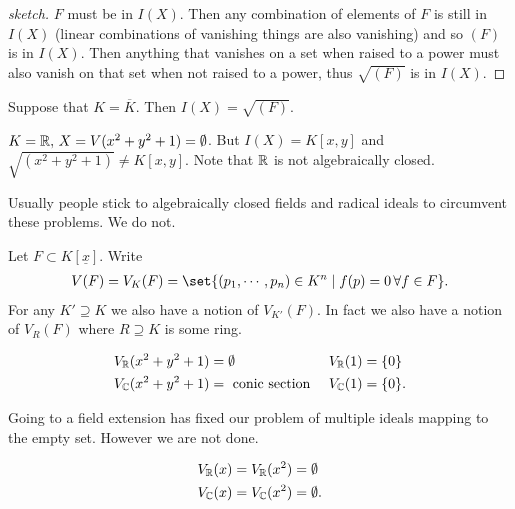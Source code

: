 \begin{proof}[sketch]
$F$ must be in $I(X)$. Then any combination of elements of $F$ is still in $I(X)$ (linear combinations of vanishing things are also vanishing) and so $(F)$ is in $I(X)$. Then anything that vanishes on a set when raised to a power must also vanish on that set when not raised to a power, thus $\sqrt{ (F) }$ is in $I(X)$.
\end{proof}

\begin{theorem}[Nullstellensatz]
Suppose that $K = \overline{K}$. Then $I(X) = \sqrt{ (F) }$.
\end{theorem}

\begin{nexample}
    $K = \mathbb{R}, \, X = V(x^2 + y^2 +1) = \emptyset$. But $I(X) = K[x,y]$ and $\sqrt{(x^2 + y^2 +1)} \neq K[x,y]$. Note that $\mathbb{R}$ is not algebraically closed.
\end{nexample}

Usually people stick to algebraically closed fields and radical ideals to circumvent these problems. We do not.

Let $F \subset K[ \underline{x} ] $. Write
\begin{align*}
    V(F) = V_K (F) = \set{(p_1, \cdots , p_n ) \in K^n \mid f(p) = 0 \, \forall f \in F}.
\end{align*}
For any $K' \supseteq K$ we also have a notion of $V_{K'}(F)$. In fact we also have a notion of $V_R ( F)$ where $R \supseteq K$ is some ring.

\begin{example}
    \begin{align*}
        V_{\mathbb{R}} ( x^2 + y^2 + 1) &= \emptyset & V_{\mathbb{R}}(1) &= \{ 0 \}  \\
        V_{\mathbb{C}} ( x^2 + y^2 + 1) &= \text{ conic section } & V_{\mathbb{C}} ( 1 ) &= \{ 0 \}.
    \end{align*}
\end{example}

Going to a field extension has fixed our problem of multiple ideals mapping to the empty set. However we are not done.

\begin{example}
    \begin{align*}
        V_{\mathbb{R}} ( x) &= V_{\mathbb{R}} ( x^2) = \emptyset\\
        V_{\mathbb{C}} ( x) &= V_{\mathbb{C}} ( x^2) = \emptyset.
    \end{align*}
\end{example}

